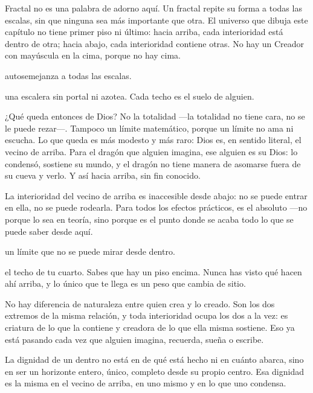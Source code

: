 \noindent Fractal no es una palabra de adorno aquí. Un fractal repite su forma a todas las escalas, sin que ninguna sea más importante que otra. El universo que dibuja este capítulo no tiene primer piso ni último: hacia arriba, cada interioridad está dentro de otra; hacia abajo, cada interioridad contiene otras. No hay un Creador con mayúscula en la cima, porque no hay cima.

\begin{fisica}
 autosemejanza a todas las escalas.

 una escalera sin portal ni azotea. Cada techo es el suelo de alguien.
\end{fisica}
¿Qué queda entonces de Dios? No la totalidad —la totalidad no tiene cara, no se le puede rezar—. Tampoco un límite matemático, porque un límite no ama ni escucha. Lo que queda es más modesto y más raro: Dios es, en sentido literal, el vecino de arriba. Para el dragón que alguien imagina, ese alguien es su Dios: lo condensó, sostiene su mundo, y el dragón no tiene manera de asomarse fuera de su cueva y verlo. Y así hacia arriba, sin fin conocido.

La interioridad del vecino de arriba es inaccesible desde abajo: no se puede entrar en ella, no se puede rodearla. Para todos los efectos prácticos, es el absoluto —no porque lo sea en teoría, sino porque es el punto donde se acaba todo lo que se puede saber desde aquí.

\begin{fisica}
 un límite que no se puede mirar desde dentro.

 el techo de tu cuarto. Sabes que hay un piso encima. Nunca has visto qué hacen ahí arriba, y lo único que te llega es un peso que cambia de sitio.
\end{fisica}
\noindent No hay diferencia de naturaleza entre quien crea y lo creado. Son los dos extremos de la misma relación, y toda interioridad ocupa los dos a la vez: es criatura de lo que la contiene y creadora de lo que ella misma sostiene. Eso ya está pasando cada vez que alguien imagina, recuerda, sueña o escribe.

La dignidad de un dentro no está en de qué está hecho ni en cuánto abarca, sino en ser un horizonte entero, único, completo desde su propio centro. Esa dignidad es la misma en el vecino de arriba, en uno mismo y en lo que uno condensa.

